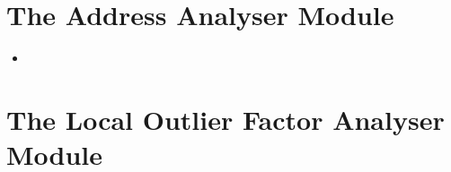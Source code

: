 \section{The Address Analyser Module}
\label{sec:impl:addr}

\begin{itemize}
	\item 
\end{itemize}

\section{The Local Outlier Factor Analyser Module}
\label{sec:impl:lof}

